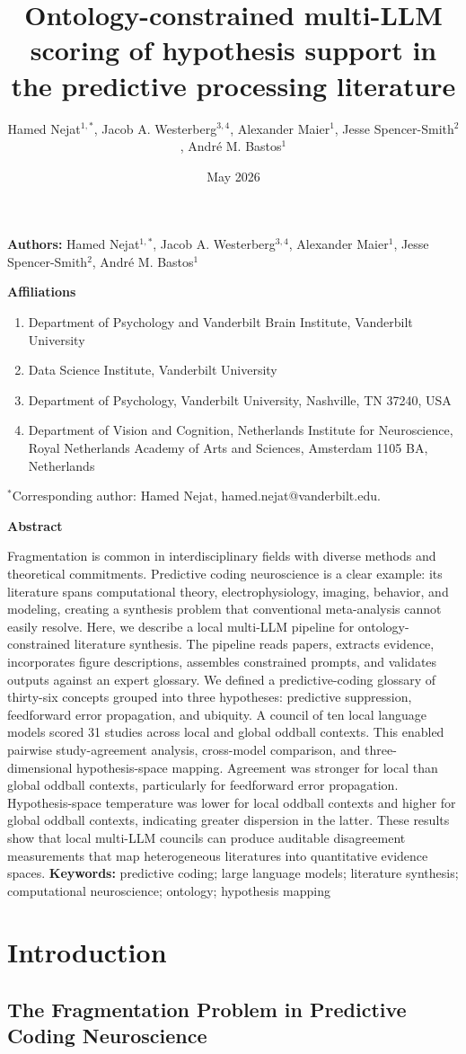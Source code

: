 \documentclass[12pt]{article}
\title{Ontology-constrained multi-LLM scoring of hypothesis support in the predictive processing literature}
\author{Hamed Nejat$^{1,*}$, Jacob A. Westerberg$^{3,4}$, Alexander Maier$^{1}$, Jesse Spencer-Smith$^{2}$, Andr\'e M. Bastos$^{1}$}
\date{May 2026}
\makeatletter
\renewcommand{\maketitle}{%
  \begin{flushleft}
  {\large\bfseries \@title\par}
  \vspace{0.9em}
  {\normalsize\textbf{Authors:} Hamed Nejat$^{1,*}$, Jacob A. Westerberg$^{3,4}$, Alexander Maier$^{1}$, Jesse Spencer-Smith$^{2}$, Andr\'e M. Bastos$^{1}$\par}
  \vspace{0.9em}
  {\normalsize\bfseries Affiliations\par}
  \vspace{0.5em}
  \begin{enumerate}[leftmargin=0.75in,label=\arabic*.]
  \item Department of Psychology and Vanderbilt Brain Institute, Vanderbilt University
  \item Data Science Institute, Vanderbilt University
  \item Department of Psychology, Vanderbilt University, Nashville, TN 37240, USA
  \item Department of Vision and Cognition, Netherlands Institute for Neuroscience, Royal Netherlands Academy of Arts and Sciences, Amsterdam 1105 BA, Netherlands
  \end{enumerate}
  \vspace{0.3em}
  {\normalsize $^*$Corresponding author: Hamed Nejat, hamed.nejat@vanderbilt.edu.\par}
  \end{flushleft}
  \vspace{0.4em}
}
\makeatother
\begin{document}
\pagestyle{plain}
\maketitle
\linenumbers

\noindent\textbf{Abstract}\par
Fragmentation is common in interdisciplinary fields with diverse methods and theoretical commitments. Predictive coding neuroscience is a clear example: its literature spans computational theory, electrophysiology, imaging, behavior, and modeling, creating a synthesis problem that conventional meta-analysis cannot easily resolve. Here, we describe a local multi-LLM pipeline for ontology-constrained literature synthesis. The pipeline reads papers, extracts evidence, incorporates figure descriptions, assembles constrained prompts, and validates outputs against an expert glossary. We defined a predictive-coding glossary of thirty-six concepts grouped into three hypotheses: predictive suppression, feedforward error propagation, and ubiquity. A council of ten local language models scored 31 studies across local and global oddball contexts. This enabled pairwise study-agreement analysis, cross-model comparison, and three-dimensional hypothesis-space mapping. Agreement was stronger for local than global oddball contexts, particularly for feedforward error propagation. Hypothesis-space temperature was lower for local oddball contexts and higher for global oddball contexts, indicating greater dispersion in the latter. These results show that local multi-LLM councils can produce auditable disagreement measurements that map heterogeneous literatures into quantitative evidence spaces.
\vspace{0.8em}
\noindent\textbf{Keywords:} predictive coding; large language models; literature synthesis; computational neuroscience; ontology; hypothesis mapping

\section{Introduction}\label{introduction}

\subsection{The Fragmentation Problem in Predictive Coding Neuroscience}\label{the-fragmentation-problem-in-predictive-coding-neuroscience}
\end{document}
